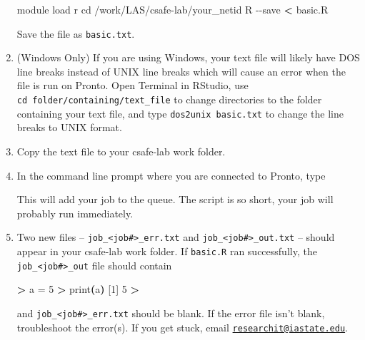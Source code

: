 \documentclass[
]{book}
\newenvironment{Shaded}{\begin{snugshade}}{\end{snugshade}}
\newcommand{\AttributeTok}[1]{\textcolor[rgb]{0.77,0.63,0.00}{#1}}
\newcommand{\BuiltInTok}[1]{#1}
\newcommand{\ExtensionTok}[1]{#1}
\newcommand{\KeywordTok}[1]{\textcolor[rgb]{0.13,0.29,0.53}{\textbf{#1}}}
\newcommand{\NormalTok}[1]{#1}
\newcommand{\OperatorTok}[1]{\textcolor[rgb]{0.81,0.36,0.00}{\textbf{#1}}}
\begin{document}
\begin{enumerate}
\begin{Shaded}
\begin{Highlighting}[]
\ExtensionTok{module}\NormalTok{ load r}
\BuiltInTok{cd}\NormalTok{ /work/LAS/csafe{-}lab/your\_netid}
\ExtensionTok{R} \AttributeTok{{-}{-}save} \OperatorTok{\textless{}}\NormalTok{ basic.R}
\end{Highlighting}
\end{Shaded}

  Save the file as \texttt{basic.txt}.
\item
  (Windows Only) If you are using Windows, your text file will likely have DOS line breaks instead of UNIX line breaks which will cause an error when the file is run on Pronto. Open Terminal in RStudio, use \texttt{cd\ folder/containing/text\_file} to change directories to the folder containing your text file, and type \texttt{dos2unix\ basic.txt} to change the line breaks to UNIX format.
\item
  Copy the text file to your csafe-lab work folder.
\item
  In the command line prompt where you are connected to Pronto, type

\begin{Shaded}
\end{Shaded}

  This will add your job to the queue. The script is so short, your job will probably run immediately.
\item
  Two new files -- \texttt{job\_\textless{}job\#\textgreater{}\_err.txt} and \texttt{job\_\textless{}job\#\textgreater{}\_out.txt} -- should appear in your csafe-lab work folder. If \texttt{basic.R} ran successfully, the \texttt{job\_\textless{}job\#\textgreater{}\_out} file should contain

\begin{Shaded}
\begin{Highlighting}[]
\OperatorTok{\textgreater{}}\NormalTok{ a }\ExtensionTok{=}\NormalTok{ 5}
\OperatorTok{\textgreater{}}\NormalTok{ print}\KeywordTok{(}\ExtensionTok{a}\KeywordTok{)}
\ExtensionTok{[1]}\NormalTok{ 5}
\OperatorTok{\textgreater{}} 
\end{Highlighting}
\end{Shaded}

  and \texttt{job\_\textless{}job\#\textgreater{}\_err.txt} should be blank. If the error file isn't blank, troubleshoot the error(s). If you get stuck, email \href{mailto:researchit@iastate.edu}{\nolinkurl{researchit@iastate.edu}}.
\end{enumerate}
\end{document}
